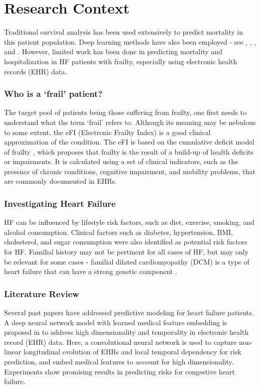 \documentclass[%
 reprint,
 amsmath,amssymb,
 aps,
 nofootinbib,
]{revtex4-2}
\theoremstyle{definition}
\begin{document}
\section{\label{rescon}Research Context}
Traditional survival analysis has been used extensively to predict mortality in this patient population. Deep learning methods have also been employed - see \citep{e2edlgjoreski}, \citep{nirschl2018deep}, \citep{10.1001/jamanetworkopen.2019.6972}, \citep{asolares2020} and \citep{lorenzoni_2019}. However, limited work has been done in predicting mortality and hospitalization in HF patients with frailty, especially using electronic health records (EHR) data.
\subsubsection{\label{frail}Who is a `frail' patient?}
The target pool of patients being those suffering from frailty, one first needs to understand what the term `frail' refers to. Although its meaning may be nebulous to some extent, the eFI (Electronic Frailty Index) is a good clinical approximation of the condition. The eFI is based on the cumulative deficit model of frailty \citep{NHS}, which proposes that frailty is the result of a build-up of health deficits or impairments. It is calculated using a set of clinical indicators, such as the presence of chronic conditions, cognitive impairment, and mobility problems, that are commonly documented in EHRs.
\subsubsection{\label{hf}Investigating Heart Failure}
HF can be influenced by lifestyle risk factors, such as diet, exercise, smoking, and alcohol consumption. Clinical factors such as diabetes, hypertension, BMI, cholesterol, and sugar consumption were also identified as potential risk factors for HF. Familial history may not be pertinent for all cases of HF, but may only be relevant for some cases - familial dilated cardiomyopathy (DCM) is a type of heart failure that can have a strong genetic component \citep{peters2020familial}.
\subsubsection{\label{pastwork}Literature Review}
Several past papers have addressed predictive modeling for heart failure patients. A deep neural network model with learned medical feature embedding is proposed in \citep{che2017} to address high dimensionality and temporality in electronic health record (EHR) data. Here, a convolutional neural network is used to capture non-linear longitudinal evolution of EHRs and local temporal dependency for risk prediction, and embed medical features to account for high dimensionality. Experiments show promising results in predicting risks for congestive heart failure.\\
\end{document}
